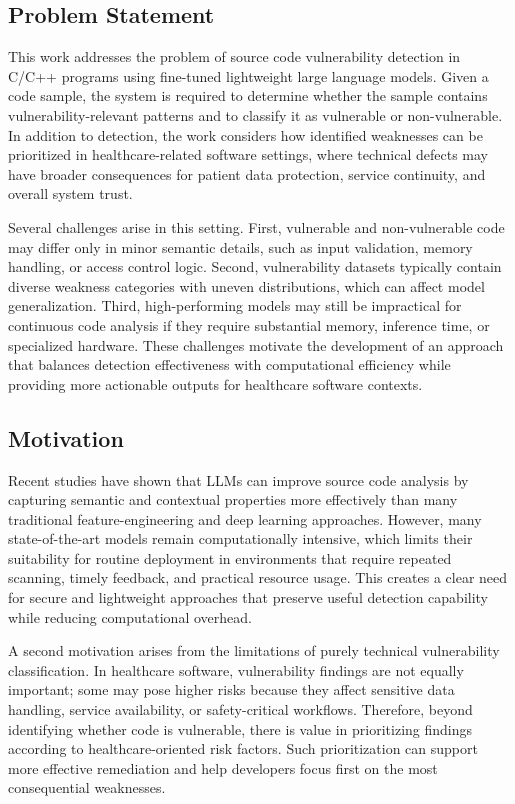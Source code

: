 \documentclass[conference]{IEEEtran}
\begin{document}
\subsection{Problem Statement}
This work addresses the problem of source code vulnerability detection in C/C++ programs using fine-tuned lightweight large language models. Given a code sample, the system is required to determine whether the sample contains vulnerability-relevant patterns and to classify it as vulnerable or non-vulnerable. In addition to detection, the work considers how identified weaknesses can be prioritized in healthcare-related software settings, where technical defects may have broader consequences for patient data protection, service continuity, and overall system trust.

Several challenges arise in this setting. First, vulnerable and non-vulnerable code may differ only in minor semantic details, such as input validation, memory handling, or access control logic. Second, vulnerability datasets typically contain diverse weakness categories with uneven distributions, which can affect model generalization. Third, high-performing models may still be impractical for continuous code analysis if they require substantial memory, inference time, or specialized hardware. These challenges motivate the development of an approach that balances detection effectiveness with computational efficiency while providing more actionable outputs for healthcare software contexts.

\subsection{Motivation}
Recent studies have shown that LLMs can improve source code analysis by capturing semantic and contextual properties more effectively than many traditional feature-engineering and deep learning approaches. However, many state-of-the-art models remain computationally intensive, which limits their suitability for routine deployment in environments that require repeated scanning, timely feedback, and practical resource usage. This creates a clear need for secure and lightweight approaches that preserve useful detection capability while reducing computational overhead.

A second motivation arises from the limitations of purely technical vulnerability classification. In healthcare software, vulnerability findings are not equally important; some may pose higher risks because they affect sensitive data handling, service availability, or safety-critical workflows. Therefore, beyond identifying whether code is vulnerable, there is value in prioritizing findings according to healthcare-oriented risk factors. Such prioritization can support more effective remediation and help developers focus first on the most consequential weaknesses.
\end{document}
